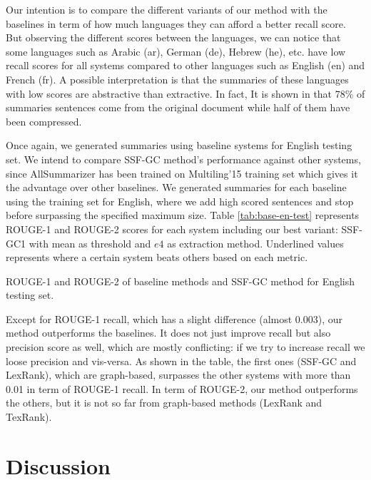 Our intention is to compare the different variants of our method with the baselines in term of how much languages they can afford a better recall score. 
But observing the different scores between the languages, we can notice that some languages such as Arabic (ar), German (de), Hebrew (he), etc. have low recall scores for all systems compared to other languages such as English (en) and French (fr). 
A possible interpretation is that the summaries of these languages with low scores are abstractive than extractive.
In fact, It is shown in \citep{99-jing-mckeown} that 78\% of summaries sentences come from the original document while half of them have been compressed.  

Once again, we generated summaries using baseline systems for English testing set. 
We intend to compare SSF-GC method's performance against other systems, since AllSummarizer has been trained on Multiling'15 training set which gives it the advantage over other baselines. 
We generated summaries for each baseline using the training set for English, where we add high scored sentences and stop before surpassing the specified maximum size.
Table \ref{tab:base-en-test} represents ROUGE-1 and ROUGE-2 scores for each system including our best variant: SSF-GC1 with mean as threshold and $ e4 $ as extraction method.
Underlined values represents where a certain system beats others based on each metric.

\begin{table}[!ht]
	\centering
	\caption{ROUGE-1 and ROUGE-2 of baseline methods and SSF-GC method for English testing set.}
	\label{tab:base-en-test}
\end{table}

Except for ROUGE-1 recall, which has a slight difference (almost 0.003), our method outperforms the baselines. 
It does not just improve recall but also precision score as well, which are mostly conflicting: if we try to increase recall we loose precision and vis-versa. 
As shown in the table, the first ones (SSF-GC and LexRank), which are graph-based, surpasses the other systems with more than 0.01 in term of ROUGE-1 recall. 
In term of ROUGE-2, our method outperforms the others, but it is not so far from graph-based methods (LexRank and TexRank).


\section{Discussion}


